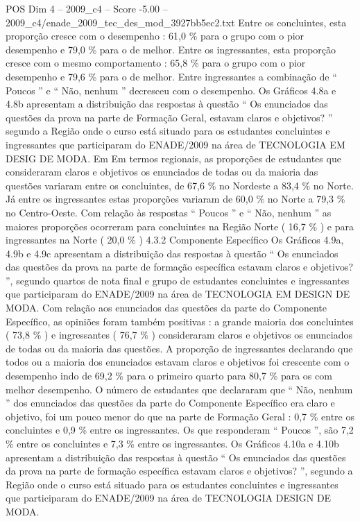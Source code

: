\begin{textsample}{POS Dim 4 – 2009\_c4 – Score -5.00 – 2009\_c4/enade\_2009\_tec\_des\_mod\_3927bb5ec2.txt}
Entre os concluintes, esta proporção cresce com o desempenho : 61,0 \% para o grupo com o pior desempenho e 79,0 \% para o de melhor.
Entre os ingressantes, esta proporção cresce com o mesmo comportamento : 65,8 \% para o grupo com o pior desempenho e 79,6 \% para o de melhor.
Entre ingressantes a combinação de “ Poucos ” e “ Não, nenhum ” decresceu com o desempenho.
Os Gráficos 4.8a e 4.8b apresentam a distribuição das respostas à questão “ Os enunciados das questões da prova na parte de Formação Geral, estavam claros e objetivos? ” segundo a Região onde o curso está situado para os estudantes concluintes e ingressantes que participaram do ENADE/2009 na área de TECNOLOGIA EM DESIG DE MODA.
Em Em termos regionais, as proporções de estudantes que consideraram claros e objetivos os enunciados de todas ou da maioria das questões variaram entre os concluintes, de 67,6 \% no Nordeste a 83,4 \% no Norte.
Já entre os ingressantes estas proporções variaram de 60,0 \% no Norte a 79,3 \% no Centro-Oeste.
Com relação às respostas “ Poucos ” e “ Não, nenhum ” as maiores proporções ocorreram para concluintes na Região Norte ( 16,7 \% ) e para ingressantes na Norte ( 20,0 \% ) 4.3.2 Componente Específico Os Gráficos 4.9a, 4.9b e 4.9c apresentam a distribuição das respostas à questão “ Os enunciados das questões da prova na parte de formação específica estavam claros e objetivos? ”, segundo quartos de nota final e grupo de estudantes concluintes e ingressantes que participaram do ENADE/2009 na área de TECNOLOGIA EM DESIGN DE MODA.
Com relação aos enunciados das questões da parte do Componente Específico, as opiniões foram também positivas : a grande maioria dos concluintes ( 73,8 \% ) e ingressantes ( 76,7 \% ) consideraram claros e objetivos os enunciados de todas ou da maioria das questões.
A proporção de ingressantes declarando que todos ou a maioria dos enunciados estavam claros e objetivos foi crescente com o desempenho indo de 69,2 \% para o primeiro quarto para 80,7 \% para os com melhor desempenho.
O número de estudantes que declararam que “ Não, nenhum ” dos enunciados das questões da parte do Componente Específico era claro e objetivo, foi um pouco menor do que na parte de Formação Geral : 0,7 \% entre os concluintes e 0,9 \% entre os ingressantes.
Os que responderam “ Poucos ”, são 7,2 \% entre os concluintes e 7,3 \% entre os ingressantes.
Os Gráficos 4.10a e 4.10b apresentam a distribuição das respostas à questão “ Os enunciados das questões da prova na parte de formação específica estavam claros e objetivos? ”, segundo a Região onde o curso está situado para os estudantes concluintes e ingressantes que participaram do ENADE/2009 na área de TECNOLOGIA DESIGN DE MODA.

\end{textsample}

